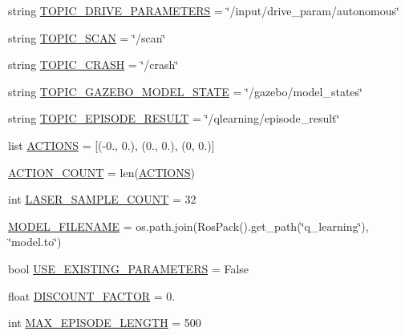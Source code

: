 \begin{DoxyCompactItemize}
\item 
string \hyperlink{namespaceparameters_a855cb11de60782b8e9997af80bdab518}{T\+O\+P\+I\+C\+\_\+\+D\+R\+I\+V\+E\+\_\+\+P\+A\+R\+A\+M\+E\+T\+E\+RS} = \char`\"{}/input/drive\+\_\+param/autonomous\char`\"{}
\item 
string \hyperlink{namespaceparameters_a28de242cdbba10666eb0c95aaef6812b}{T\+O\+P\+I\+C\+\_\+\+S\+C\+AN} = \char`\"{}/scan\char`\"{}
\item 
string \hyperlink{namespaceparameters_a5e392ed4d998f10824bfd96a0eae2988}{T\+O\+P\+I\+C\+\_\+\+C\+R\+A\+SH} = \char`\"{}/crash\char`\"{}
\item 
string \hyperlink{namespaceparameters_a9d4157266ec0afde91ab7d58be4f688d}{T\+O\+P\+I\+C\+\_\+\+G\+A\+Z\+E\+B\+O\+\_\+\+M\+O\+D\+E\+L\+\_\+\+S\+T\+A\+TE} = \char`\"{}/gazebo/model\+\_\+states\char`\"{}
\item 
string \hyperlink{namespaceparameters_aa69db8cd2d598f0d10212ea8df6a2139}{T\+O\+P\+I\+C\+\_\+\+E\+P\+I\+S\+O\+D\+E\+\_\+\+R\+E\+S\+U\+LT} = \char`\"{}/qlearning/episode\+\_\+result\char`\"{}
\item 
list \hyperlink{namespaceparameters_a585a25d0a26bcab4242d2e3fb1c1f93e}{A\+C\+T\+I\+O\+NS} = \mbox{[}(-\/0., 0.), (0., 0.), (0, 0.)\mbox{]}
\item 
\hyperlink{namespaceparameters_ae4be13f6dac91f471da3efb4618a54c1}{A\+C\+T\+I\+O\+N\+\_\+\+C\+O\+U\+NT} = len(\hyperlink{namespaceparameters_a585a25d0a26bcab4242d2e3fb1c1f93e}{A\+C\+T\+I\+O\+NS})
\item 
int \hyperlink{namespaceparameters_a24735dce78cf9899cf1ec4bda2ea4eac}{L\+A\+S\+E\+R\+\_\+\+S\+A\+M\+P\+L\+E\+\_\+\+C\+O\+U\+NT} = 32
\item 
\hyperlink{namespaceparameters_aff8b0668384f3fa2d1212d3bd0ff42fa}{M\+O\+D\+E\+L\+\_\+\+F\+I\+L\+E\+N\+A\+ME} = os.\+path.\+join(Ros\+Pack().get\+\_\+path(\char`\"{}q\+\_\+learning\char`\"{}), \char`\"{}model.\+to\char`\"{})
\item 
bool \hyperlink{namespaceparameters_a0cffcb215ac12a1700baedb1a13ec8d5}{U\+S\+E\+\_\+\+E\+X\+I\+S\+T\+I\+N\+G\+\_\+\+P\+A\+R\+A\+M\+E\+T\+E\+RS} = False
\item 
float \hyperlink{namespaceparameters_a70176024e0f585c846365800f1c7819c}{D\+I\+S\+C\+O\+U\+N\+T\+\_\+\+F\+A\+C\+T\+OR} = 0.
\item 
int \hyperlink{namespaceparameters_aa473cc3b100416af3310c6c5a6d19570}{M\+A\+X\+\_\+\+E\+P\+I\+S\+O\+D\+E\+\_\+\+L\+E\+N\+G\+TH} = 500

\end{DoxyCompactItemize}
